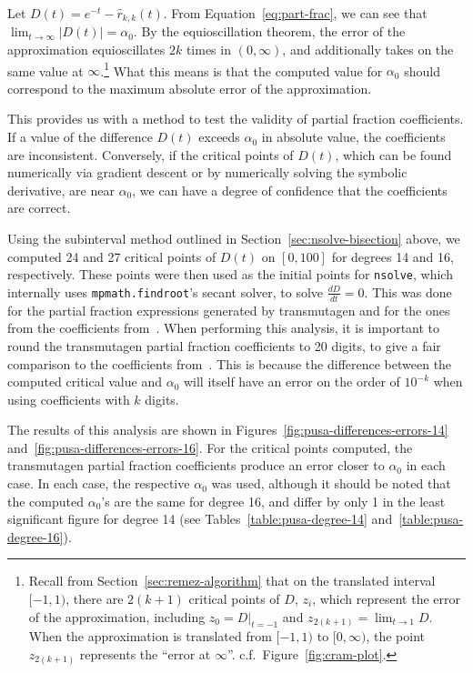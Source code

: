 Let $D(t) = e^{-t} - \hat{r}_{k,k}(t)$. From Equation~\ref{eq:part-frac}, we can see that
$\lim_{t\to\infty}{\left|D(t) \right|} = \alpha_0$. By the
equioscillation theorem, the error of the approximation equioscillates $2k$
times in $(0, \infty)$, and additionally takes on the same value at
$\infty$.\footnote{Recall from Section~\ref{sec:remez-algorithm} that on the
  translated interval $[-1, 1)$, there are $2(k+1)$ critical points of $D$,
  $z_i$, which represent the error of the approximation, including
  $z_0 = D|_{t=-1}$ and $z_{2(k+1)}=\lim_{t\to 1}{D}$. When the approximation
  is translated from $[-1, 1)$ to $[0, \infty)$, the point $z_{2(k + 1)}$
  represents the ``error at $\infty$''. c.f.\ Figure~\ref{fig:cram-plot}.}
What this means is that the computed value for $\alpha_0$ should correspond to
the maximum absolute error of the approximation.

This provides us with a method to test the validity of partial fraction
coefficients. If a value of the difference $D(t)$ exceeds $\alpha_0$ in
absolute value, the coefficients are inconsistent. Conversely, if the critical
points of $D(t)$, which can be found numerically via gradient descent or by
numerically solving the symbolic derivative, are near $\alpha_0$, we can have
a degree of confidence that the coefficients are correct.

Using the subinterval method outlined in Section~\ref{sec:nsolve-bisection}
above, we computed 24 and 27 critical points of $D(t)$ on $[0, 100]$ for degrees
14 and 16, respectively. These points were then used as the initial points for
\texttt{nsolve}, which internally uses \texttt{mpmath.findroot}'s secant
solver, to solve $\frac{dD}{dt}=0$. This was done for the partial fraction
expressions generated by transmutagen and for the ones from the coefficients
from~\cite{pusa2012correction}.  When performing this analysis, it is
important to round the transmutagen partial fraction coefficients to 20
digits, to give a fair comparison to the coefficients
from~\cite{pusa2012correction}. This is because the difference between the
computed critical value and $\alpha_0$ will itself have an error on the order
of $10^{-k}$ when using coefficients with $k$ digits.

The results of this analysis are shown in
Figures~\ref{fig:pusa-differences-errors-14}
and~\ref{fig:pusa-differences-errors-16}. For the critical points computed,
the transmutagen partial fraction coefficients produce an error closer to
$\alpha_0$ in each case. In each case, the respective $\alpha_0$ was used,
although it should be noted that the computed $\alpha_0$'s are the
same for degree 16, and differ by only 1 in the least significant figure for
degree 14 (see Tables~\ref{table:pusa-degree-14} and~\ref{table:pusa-degree-16}).

